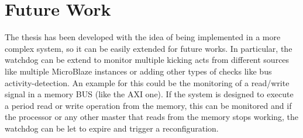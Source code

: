 








\section{Future Work}

The thesis has been developed with the idea of being implemented in a more complex system, so it can be easily extended for future works. In particular, the watchdog can be extend to monitor multiple kicking acts from different sources like multiple MicroBlaze instances or adding other types of checks like bus activity-detection. An example for this could be the monitoring of a read/write signal in a memory BUS (like the AXI one). If the system is designed to execute a period read or write operation from the memory, this can be monitored and if the processor or any other master that reads from the memory stops working, the watchdog can be let to expire and trigger a reconfiguration. \bigskip

